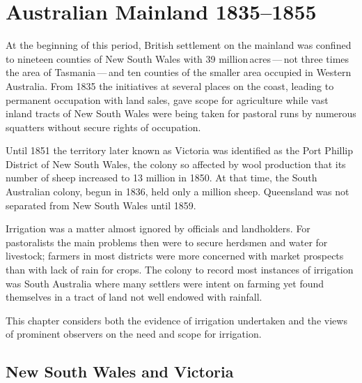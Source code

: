 
\chapter{Australian Mainland 1835--1855}

\label{ch:mainland} 

\setcounter{endnote}{0}

At the beginning of this period, British settlement on the mainland
was confined to nineteen counties of New South Wales with 39
million\,acres\,---\,not three times the area of Tasmania\,---\,and
ten counties of the smaller area occupied in Western Australia.  From
1835 the initiatives at several places on the coast, leading to
permanent occupation with land sales, gave scope for agriculture while
vast inland tracts of New South Wales were being taken for pastoral
runs by numerous squatters without secure rights of occupation.

Until 1851 the territory later known as Victoria was identified as the
Port Phillip District of New South Wales, the colony so affected by
wool production that its number of sheep
increased to 13 million in 1850.  At that time, the South Australian
colony, begun in 1836, held only a million sheep.
Queensland was not separated from New South Wales until
1859.

Irrigation was a matter almost ignored by officials and landholders.
For pastoralists the main problems then were to secure herdsmen and
water for livestock; farmers in most districts were more concerned
with market prospects than with lack of rain for crops.  The colony to
record most instances of irrigation was South Australia where many
settlers were intent on farming yet found themselves in a tract of
land not well endowed with rainfall.

This chapter considers both the evidence of irrigation undertaken and
the views of prominent observers on the need and scope for irrigation.

\section*{New South Wales and Victoria}
 

